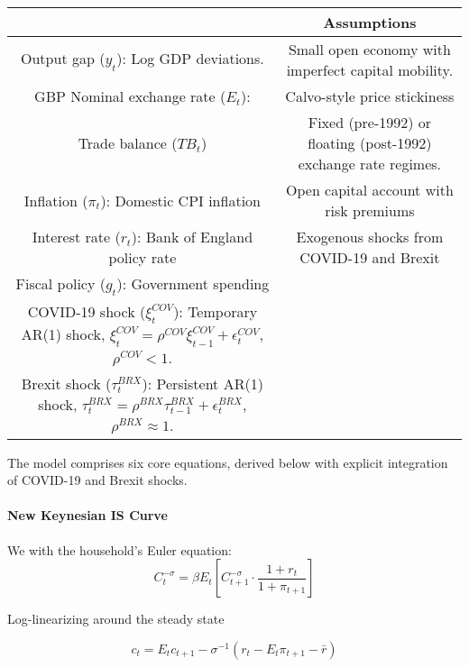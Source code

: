 \documentclass[
]{article}
\let\oldtable\table
\let\endoldtable\endtable
\renewenvironment{table}[1][H]{\oldtable[H]}{\endoldtable}
\begin{document}
\begin{table}[ht]
\centering
\caption{\textsc{Notations and Assumptions} }
\label{tab:notations}
\begin{tabular}{cc}}
\toprule
\textbf{Notations} & \textbf{Assumptions} \\
\midrule
Output gap (\( y_t \)): Log GDP deviations. & Small open economy with imperfect capital mobility. \\[1.5ex] 
GBP Nominal exchange rate (\( E_t \)): & Calvo-style price stickiness %
\\
Trade balance (\( TB_t \)) & Fixed (pre-1992) or floating (post-1992) exchange rate regimes. \\[1.5ex] 
Inflation (\( \pi_t \)): Domestic CPI inflation & Open capital account with risk premiums %
\\
Interest rate (\( r_t \)): Bank of England policy rate & Exogenous shocks from COVID-19 and Brexit %
\\ 
Fiscal policy (\( g_t \)): Government spending & \\
COVID-19 shock (\( \xi_t^{COV} \)): Temporary AR(1) shock, \( \xi_t^{COV} = \rho^{COV} \xi_{t-1}^{COV} + \epsilon_t^{COV} \), \( \rho^{COV} < 1 \). & \\
Brexit shock (\( \tau_t^{BRX} \)): Persistent AR(1) shock, \( \tau_t^{BRX} = \rho^{BRX} \tau_{t-1}^{BRX} + \epsilon_t^{BRX} \), \( \rho^{BRX} \approx 1 \). & \\
\bottomrule
\end{tabular}
\end{table}

The model comprises six core equations, derived below with explicit integration of COVID-19 and Brexit shocks.

\paragraph*{New Keynesian IS Curve}
We with the household's Euler equation:
\begin{equation*}
C_t^{-\sigma} = \beta E_t \left[ C_{t+1}^{-\sigma} \cdot \frac{1 + r_t}{1 + \pi_{t+1}} \right]
\end{equation*}

Log-linearizing around the steady state 

\begin{equation*}
c_t = E_t c_{t+1} - \sigma^{-1} (r_t - E_t \pi_{t+1} - \bar{r})
\end{equation*}
\end{document}
